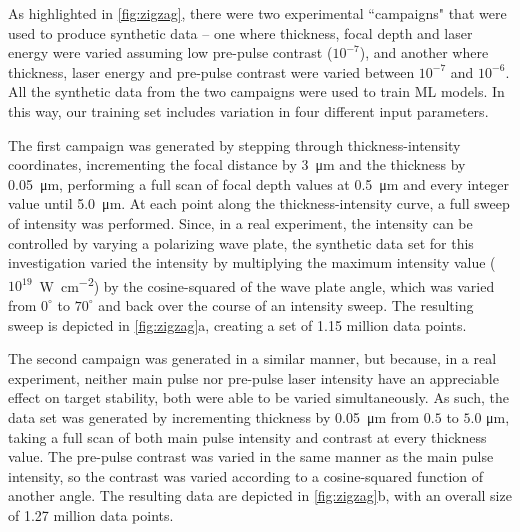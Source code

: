 As highlighted in \autoref{fig:zigzag}, there were two experimental ``campaigns" that were used to produce synthetic data -- one where thickness, focal depth and laser energy were varied assuming low pre-pulse contrast ($10^{-7}$), and another where thickness, laser energy and pre-pulse contrast were varied between $10^{-7}$ and $10^{-6}$. All the synthetic data from the two campaigns were used to train \gls{ML} models. In this way, our training set includes variation in four different input parameters.

The first campaign was generated by stepping through thickness-intensity coordinates, incrementing the focal distance by \SI{3}{\micro \meter} and the thickness by \SI{0.05}{\micro \meter}, performing a full scan of focal depth values at \SI{0.5}{\micro \meter} and every integer value until \SI{5.0}{\micro \meter}.  At each point along the thickness-intensity curve, a full sweep of intensity was performed.  Since, in a real experiment, the intensity can be controlled by varying a polarizing wave plate, the synthetic data set for this investigation varied the intensity by multiplying the maximum intensity value ($10^{19}$~\unit{W . cm^{-2}}) by the cosine-squared of the wave plate angle, which was varied from $0^{\circ}$ to $70^{\circ}$ and back over the course of an intensity sweep.  The resulting sweep is depicted in \autoref{fig:zigzag}a, creating a set of 1.15 million data points.  

The second campaign was generated in a similar manner, but because, in a real experiment, neither main pulse nor pre-pulse laser intensity have an appreciable effect on target stability, both were able to be varied simultaneously.  As such, the data set was generated by incrementing thickness by \SI{0.05}{\micro \meter} from $0.5$ to $5.0$ \unit{\micro \meter}, taking a full scan of both main pulse intensity and contrast at every thickness value.  The pre-pulse contrast was varied in the same manner as the main pulse intensity, so the contrast was varied according to a cosine-squared function of another angle.  The resulting data are depicted in \autoref{fig:zigzag}b, with an overall size of 1.27 million data points.

